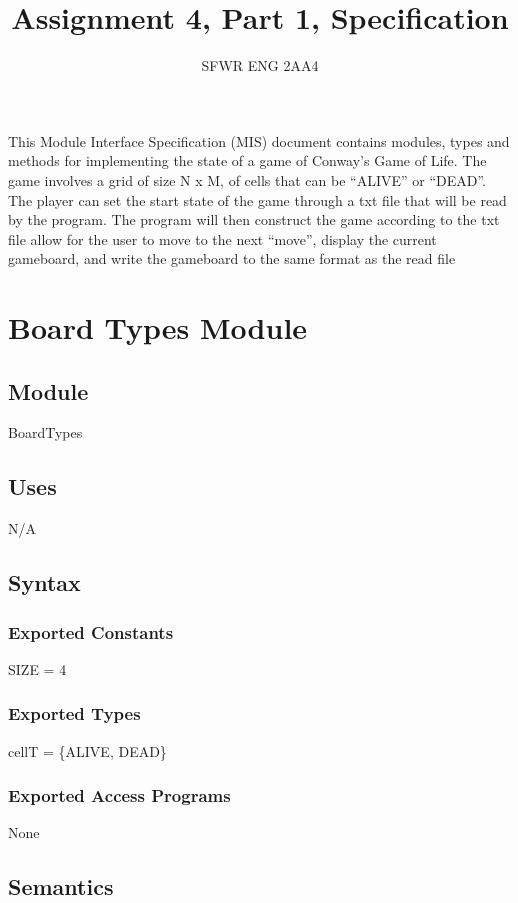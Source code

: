 \documentclass[12pt]{article}
\title{Assignment 4, Part 1, Specification}
\author{SFWR ENG 2AA4}
\begin{document}
\maketitle
This Module Interface Specification (MIS) document contains modules, types and
methods for implementing the state of a game of Conway's Game of Life. The game involves a grid of size N x M, of cells that can be ``ALIVE'' or ``DEAD''. The player can set the start state of the game through a txt file that will be read by the program. The program will then construct the game according to the txt file allow for the user to move to the next ``move'', display the current gameboard, and write the gameboard to the same format as the read file


\newpage

\section* {Board Types Module}

\subsection*{Module}

BoardTypes

\subsection* {Uses}

N/A

\subsection* {Syntax}

\subsubsection* {Exported Constants}
SIZE = 4

\subsubsection* {Exported Types}
cellT = \{ALIVE, DEAD\} 

\subsubsection* {Exported Access Programs}

None

\subsection* {Semantics}
\end{document}
